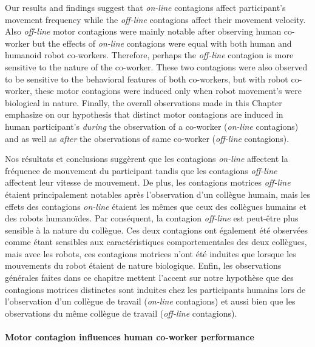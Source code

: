 Our results and findings suggest that \textit{on-line} contagions affect participant's movement frequency while the \textit{off-line} contagions affect their movement velocity. Also \textit{off-line} motor contagions were mainly notable after observing human co-worker but the effects of \textit{on-line} contagions were equal with both human and humanoid robot co-workers. Therefore, perhaps the \textit{off-line} contagion is more sensitive to the nature of the co-worker. These two contagions were also observed to be sensitive to the behavioral features of both co-workers, but with robot co-worker, these motor contagions were induced only when robot movement's were biological in nature.  Finally, the overall observations made in this Chapter emphasize on our hypothesis that distinct motor contagions are induced in human participant's \emph{during} the observation of a co-worker (\textit{on-line} contagions) and as well as \emph{after} the observations of same co-worker (\textit{off-line} contagions).

Nos résultats et conclusions suggèrent que les contagions \textit{on-line} affectent la fréquence de mouvement du participant tandis que les contagions \textit{off-line} affectent leur vitesse de mouvement. De plus, les contagions motrices \textit{off-line} étaient principalement notables après l'observation d'un collègue humain, mais les effets des contagions \textit{on-line} étaient les mêmes que ceux des collègues humains et des robots humanoïdes. Par conséquent, la contagion \textit{off-line} est peut-être plus sensible à la nature du collègue. Ces deux contagions ont également été observées comme étant sensibles aux caractéristiques comportementales des deux collègues, mais avec les robots, ces contagions motrices n'ont été induites que lorsque les mouvements du robot étaient de nature biologique.  Enfin, les observations générales faites dans ce chapitre mettent l'accent sur notre hypothèse que des contagions motrices distinctes sont induites chez les participants humains lors de l'observation d'un collègue de travail (\textit{on-line} contagions) et aussi bien que les observations du même collègue de travail (\textit{off-line} contagions).


\paragraph*{\LARGE {Motor contagion influences human co-worker performance \\}\\}

